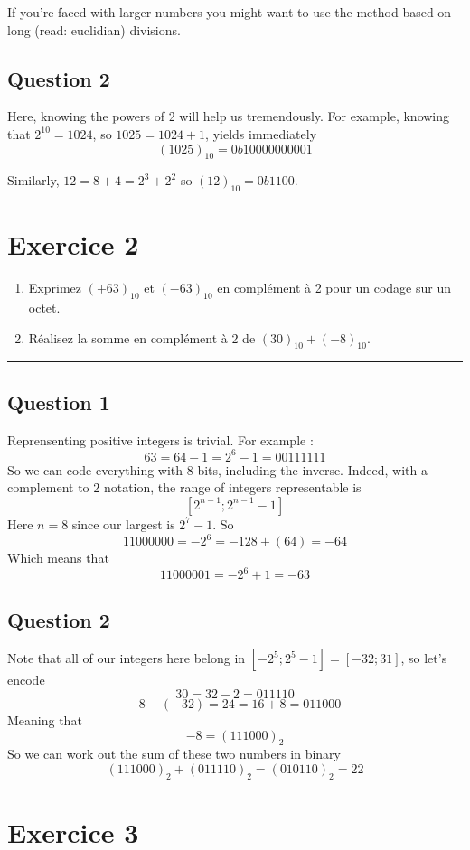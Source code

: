 \documentclass[a4paper,10pt]{article}
\def\centralruler{\begin{center}\rule{5cm}{.1pt}\end{center}}
\begin{document}
If you're faced with larger numbers you might want to use the method based on long (read: euclidian) divisions.

\subsection{Question 2}

Here, knowing the powers of 2 will help us tremendously. For example, knowing that $2^{10}=1024$, so $1025=1024+1$, yields immediately
\[
(1025)_{10} = 0b10000000001
\]

Similarly, $12=8+4 = 2^3+2^2$ so $(12)_{10}=0b1100$.

\section{Exercice 2}
\begin{enumerate}
	\item Exprimez $(+63)_{10}$ et $(-63)_{10}$ en complément à 2 pour un codage sur un octet.
	\item Réalisez la somme en complément à 2 de $(30)_{10}+(-8)_{10}$.
\end{enumerate}
\centralruler

\subsection{Question 1}

Reprensenting positive integers is trivial. For example :
$$63 = 64 - 1 = 2^6 - 1 = 00111111$$
So we can code everything with 8 bits, including the inverse. Indeed, with a complement to $2$ notation, the range of integers representable is
$$[2^{n-1};2^{n-1}-1]$$
Here $n=8$ since our largest is $2^7-1$. So
$$11000000 = -2^{6} = -128 + (64) = -64$$
Which means that
$$11000001 = -2^{6}+1 = -63$$

\subsection{Question 2}

Note that all of our integers here belong in $[-2^5;2^5-1]=[-32;31]$, so let's encode
$$30 = 32 - 2 = 011110$$
$$-8 - (-32) = 24 = 16 + 8 = 011000$$
Meaning that
$$-8 = (111000)_{2}$$
So we can work out the sum of these two numbers in binary
$$(111000)_2+(011110)_2=(010110)_2 = 22$$

\section{Exercice 3}
\end{document}
